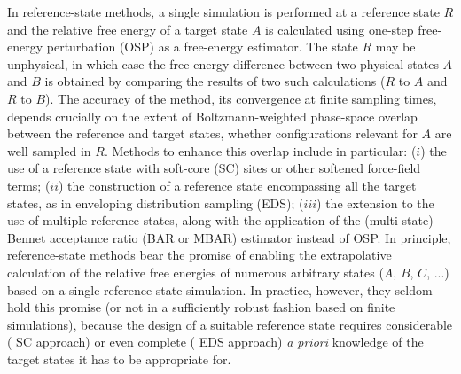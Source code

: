 In reference-state methods, a single simulation is performed at a reference state $R$ and the relative free energy of a target state $A$ is calculated using one-step free-energy perturbation\cite{ZW54.1,MA95.2,LI96.1,MA99.10,SC99.3,RA12.6,RA17.5,BO17.2} (OSP) as a free-energy estimator. The state $R$ may be unphysical, in which case the free-energy difference between two physical states $A$ and $B$ is obtained by comparing the results of two such calculations ($R$ to $A$ and $R$ to $B$). The accuracy of the method, \ie{} its convergence at finite sampling times, depends crucially on the extent of Boltzmann-weighted phase-space overlap between the reference and target
states\cite{LU01.1,LU01.2,HA10.3,BO17.2},
%
\ie{} whether configurations relevant for $A$ are well sampled in $R$. Methods to enhance this overlap include in particular: 
($i$) the use of a reference state with soft-core\cite{BE94.1} (SC) sites\cite{MA95.2,OO03.1,OO04.2,KH11.2} 
or other softened force-field terms\cite{MA91.4,ME16.1,WA18.13,XI18.3};
%
($ii$) the construction of a reference state encompassing all the target states, as in enveloping distribution sampling\cite{CH07.6,CH08.3,CH09.1,CH09.3} (EDS);
($iii$) the extension to the use of multiple reference states\cite{KH11.2}, along with the application of 
the (multi-state\cite{SH08.7}) Bennet acceptance ratio\cite{BE76.3,SH03.5} (BAR or MBAR) estimator instead of OSP.
In principle, reference-state methods bear the promise of enabling the extrapolative calculation of the relative free energies of numerous arbitrary states ($A$, $B$, $C$, ...) based on a single reference-state simulation. In practice, however, they seldom hold this promise (or not in a sufficiently robust fashion based on finite simulations), because the design of a suitable reference state requires considerable (\eg{} SC approach) or even complete (\eg{} EDS approach) \textit{a priori} knowledge of the target states it has to be appropriate for.

